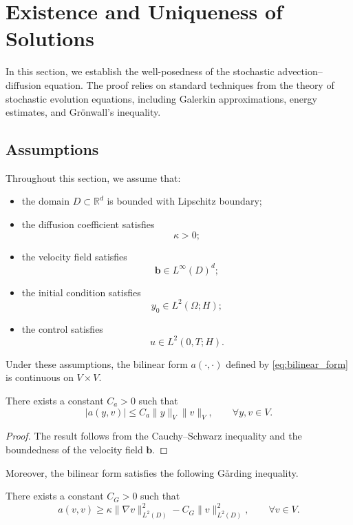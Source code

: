 \section{Existence and Uniqueness of Solutions}

In this section, we establish the well-posedness of the stochastic advection--diffusion equation. 
The proof relies on standard techniques from the theory of stochastic evolution equations, 
including Galerkin approximations, energy estimates, and Grönwall's inequality.

\subsection{Assumptions}

Throughout this section, we assume that:

\begin{itemize}
\item the domain \(D\subset\mathbb{R}^d\) is bounded with Lipschitz boundary;
\item the diffusion coefficient satisfies
\[
\kappa>0;
\]
\item the velocity field satisfies
\[
\mathbf b\in L^\infty(D)^d;
\]
\item the initial condition satisfies
\[
y_0\in L^2(\Omega;H);
\]
\item the control satisfies
\[
u\in L^2(0,T;H).
\]
\end{itemize}

Under these assumptions, the bilinear form \(a(\cdot,\cdot)\) defined by \eqref{eq:bilinear_form} 
is continuous on \(V\times V\).

\begin{lemma}
There exists a constant \(C_a>0\) such that
\[
|a(y,v)|
\le
C_a
\|y\|_V
\|v\|_V,
\qquad
\forall y,v\in V.
\]
\end{lemma}

\begin{proof}
The result follows from the Cauchy--Schwarz inequality and the boundedness of the velocity field 
\(\mathbf b\).
\end{proof}

Moreover, the bilinear form satisfies the following G{\aa}rding inequality.

\begin{lemma}
There exists a constant \(C_G>0\) such that
\[
a(v,v)
\ge
\kappa
\|\nabla v\|_{L^2(D)}^2
-
C_G
\|v\|_{L^2(D)}^2,
\qquad
\forall v\in V.
\]
\end{lemma}

